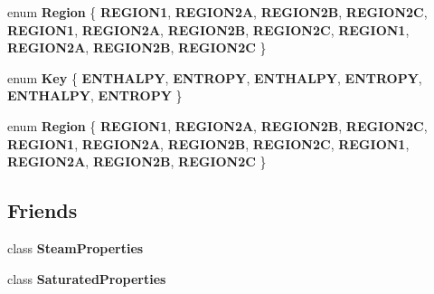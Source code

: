 \begin{DoxyCompactItemize}
enum {\bfseries Region} \{ \newline
{\bfseries R\+E\+G\+I\+O\+N1}, 
{\bfseries R\+E\+G\+I\+O\+N2A}, 
{\bfseries R\+E\+G\+I\+O\+N2B}, 
{\bfseries R\+E\+G\+I\+O\+N2C}, 
\newline
{\bfseries R\+E\+G\+I\+O\+N1}, 
{\bfseries R\+E\+G\+I\+O\+N2A}, 
{\bfseries R\+E\+G\+I\+O\+N2B}, 
{\bfseries R\+E\+G\+I\+O\+N2C}, 
\newline
{\bfseries R\+E\+G\+I\+O\+N1}, 
{\bfseries R\+E\+G\+I\+O\+N2A}, 
{\bfseries R\+E\+G\+I\+O\+N2B}, 
{\bfseries R\+E\+G\+I\+O\+N2C}
 \}
\item 
\mbox{\label{class_steam_system_modeler_tool_aed38516c350ca4ecf17b545e07d41dcd}} 
enum {\bfseries Key} \{ \newline
{\bfseries E\+N\+T\+H\+A\+L\+PY}, 
{\bfseries E\+N\+T\+R\+O\+PY}, 
{\bfseries E\+N\+T\+H\+A\+L\+PY}, 
{\bfseries E\+N\+T\+R\+O\+PY}, 
\newline
{\bfseries E\+N\+T\+H\+A\+L\+PY}, 
{\bfseries E\+N\+T\+R\+O\+PY}
 \}
\item 
\mbox{\label{class_steam_system_modeler_tool_a162eeadc7eb56a9b50b7a8f630eb8f05}} 
enum {\bfseries Region} \{ \newline
{\bfseries R\+E\+G\+I\+O\+N1}, 
{\bfseries R\+E\+G\+I\+O\+N2A}, 
{\bfseries R\+E\+G\+I\+O\+N2B}, 
{\bfseries R\+E\+G\+I\+O\+N2C}, 
\newline
{\bfseries R\+E\+G\+I\+O\+N1}, 
{\bfseries R\+E\+G\+I\+O\+N2A}, 
{\bfseries R\+E\+G\+I\+O\+N2B}, 
{\bfseries R\+E\+G\+I\+O\+N2C}, 
\newline
{\bfseries R\+E\+G\+I\+O\+N1}, 
{\bfseries R\+E\+G\+I\+O\+N2A}, 
{\bfseries R\+E\+G\+I\+O\+N2B}, 
{\bfseries R\+E\+G\+I\+O\+N2C}
 \}
\end{DoxyCompactItemize}
\subsection*{Friends}
\begin{DoxyCompactItemize}
\item 
\mbox{\label{class_steam_system_modeler_tool_a7e1e8a7691c09b03ba5c48246617deba}} 
class {\bfseries Steam\+Properties}
\item 
\mbox{\label{class_steam_system_modeler_tool_aa9f8025f33479e7f4a9640c0ac39d2f6}} 
class {\bfseries Saturated\+Properties}
\end{DoxyCompactItemize}


